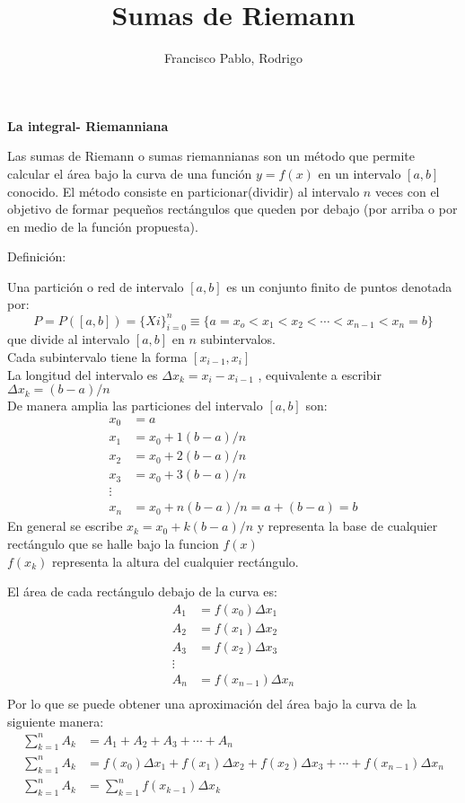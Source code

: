 \documentclass[12pt, letterpaper]{article}
\begin{document}
\title{Sumas de Riemann}
\author{Francisco Pablo, Rodrigo}
\begin{large}\textbf{La integral- Riemanniana}\end{large}

Las sumas de Riemann o  sumas riemannianas son un método que permite calcular el área bajo la curva de una función $y=f(x)$  en un intervalo $[a,b]$ conocido. El método consiste en particionar(dividir) al intervalo $n$ veces con el objetivo de formar pequeños rectángulos que queden por debajo (por arriba o por en medio de la función propuesta).  

\begin{large}Definición:\end{large}
Una partición o red de intervalo $[a,b]$ es un conjunto finito de puntos denotada por:
$$P=P([a,b])=\{Xi\}_{i=0}^n\equiv\{a=x_o<x_1<x_2< \cdots <x_{n-1}<x_n=b\}$$
que divide al intervalo $[a,b]$ en $n$ subintervalos.\\
Cada subintervalo tiene la forma $[x_{i-1},x_i]$ \\
La longitud del intervalo es  $\Delta x_k=x_i-x_{i-1}$ , equivalente a escribir $\Delta x_k=(b-a)/n$ \\
De manera amplia las particiones del intervalo $[a,b]$ son:\\
\begin{align*}
x_0&=a\\
x_1&=x_0+1(b-a)/n\\
x_2&=x_0+2(b-a)/n\\
x_3&=x_0+3(b-a)/n\\
\vdots\\
x_n&=x_0+n(b-a)/n=a+(b-a)=b
\end{align*}
En general se escribe $x_k=x_0+k(b-a)/n$ y representa la base de cualquier rectángulo que se halle bajo la funcion $f(x)$\\
$f(x_k)$ representa la altura del cualquier rectángulo.

El área de cada rectángulo debajo de la curva es:\\
\begin{align*}
A_1&=f(x_0)\Delta x_1\\
A_2&=f(x_1)\Delta x_2\\
A_3&=f(x_2)\Delta x_3\\
\vdots\\
A_n&=f(x_{n-1})\Delta x_n\\
\end{align*}
Por lo que se puede obtener una aproximación del área bajo la curva de la siguiente manera:
\begin{align*}
\displaystyle\sum_{k=1}^nA_k&=A_1+A_2+A_3+\cdots +A_n\\
\displaystyle\sum_{k=1}^nA_k&=f(x_0)\Delta x_1+f(x_1)\Delta x_2+f(x_2)\Delta x_3+\cdots +f(x_{n-1})\Delta x_n\\
\displaystyle\sum_{k=1}^nA_k&=\sum_{k=1}^nf(x_{k-1})\Delta x_k  %
\end{align*}
\end{document}
